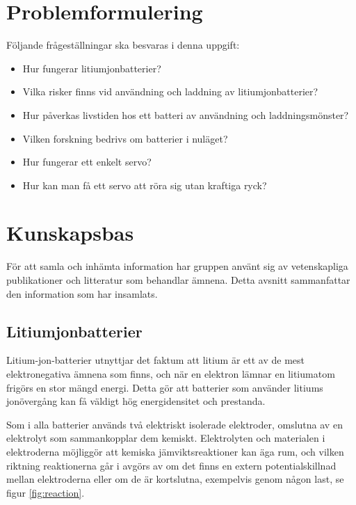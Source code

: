 \documentclass[a4paper,12pt]{article}
\begin{document}
\section{Problemformulering}
Följande frågeställningar ska besvaras i denna uppgift:
\begin{itemize}
\item Hur fungerar litiumjonbatterier?

\item Vilka risker finns vid användning och laddning av litiumjonbatterier?

\item Hur påverkas livstiden hos ett batteri av användning och laddningsmönster?

\item Vilken forskning bedrivs om batterier i nuläget?

\item Hur fungerar ett enkelt servo?

\item Hur kan man få ett servo att röra sig utan kraftiga ryck?
\end{itemize}
\section{Kunskapsbas}
För att samla och inhämta information har gruppen använt sig av vetenskapliga publikationer och litteratur som behandlar ämnena. Detta avsnitt sammanfattar den information som har insamlats.

\subsection{Litiumjonbatterier}
Litium-jon-batterier utnyttjar det faktum att litium är ett av de mest elektronegativa ämnena som finns, och när en elektron lämnar en litiumatom frigörs en stor mängd energi. Detta gör att batterier som använder litiums jonövergång kan få väldigt hög energidensitet och prestanda.

Som i alla batterier används två elektriskt isolerade elektroder, omslutna av en elektrolyt som sammankopplar dem kemiskt. Elektrolyten och materialen i elektroderna möjliggör att kemiska jämviktsreaktioner kan äga rum, och vilken riktning reaktionerna går i avgörs av om det finns en extern potentialskillnad mellan elektroderna eller om de är kortslutna, exempelvis genom någon last, se figur \ref{fig:reaction}. \cite{glaize13}

\end{document}
